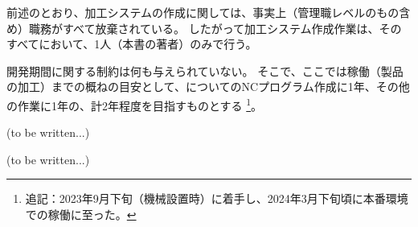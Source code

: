 




前述のとおり、加工システムの作成に関しては、事実上（管理職レベルのもの含め）職務がすべて放棄されている。
したがって加工システム作成作業は、そのすべてにおいて、1人（本書の著者）のみで行う。



開発期間に関する制約は何も与えられていない。
そこで、ここでは稼働（製品の加工）までの概ねの目安として、\Dimple についてのNCプログラム作成に1年、その他の作業に1年の、計2年程度を目指すものとする
\footnote{追記：2023年9月下旬（機械設置時）に着手し、2024年3月下旬頃に本番環境での稼働に至った。}。



(to be written...)



(to be written...)


